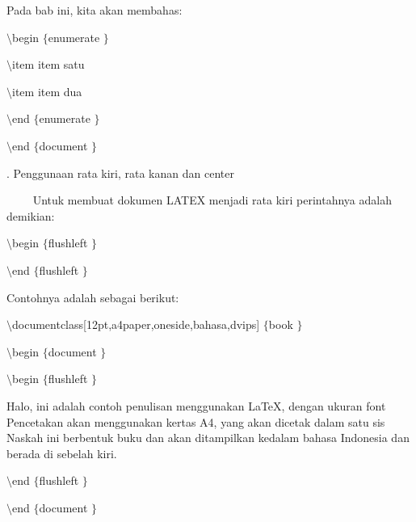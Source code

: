 \vspace{12pt}
{\fontsize{10pt}{10pt}\selectfont Pada bab ini, kita akan membahas:} \par
{\fontsize{10pt}{10pt}\selectfont  $  \setminus  $begin $  \{  $enumerate $  \}  $} \par
{\fontsize{10pt}{10pt}\selectfont  $  \setminus  $item item satu} \par
{\fontsize{10pt}{10pt}\selectfont  $  \setminus  $item item dua} \par
{\fontsize{10pt}{10pt}\selectfont  $  \setminus  $end $  \{  $enumerate $  \}  $} \par
{\fontsize{10pt}{10pt}\selectfont  $  \setminus  $end $  \{  $document $  \}  $} \par
\vspace{10pt}
. Penggunaan rata kiri, rata kanan dan center \par
\noindent 
~~~~ Untuk membuat dokumen LATEX menjadi rata kiri perintahnya adalah demikian: \par
{\fontsize{10pt}{10pt}\selectfont  $  \setminus  $begin $  \{  $flushleft $  \}  $} \par
{\fontsize{10pt}{10pt}\selectfont [kalimat]} \par
{\fontsize{10pt}{10pt}\selectfont  $  \setminus  $end $  \{  $flushleft $  \}  $} \par
\vspace{12pt}
Contohnya adalah sebagai berikut: \par
{\fontsize{10pt}{10pt}\selectfont  $  \setminus  $documentclass[12pt,a4paper,oneside,bahasa,dvips] $  \{  $book $  \}  $} \par
{\fontsize{10pt}{10pt}\selectfont  $  \setminus  $begin $  \{  $document $  \}  $} \par
{\fontsize{10pt}{10pt}\selectfont  $  \setminus  $begin $  \{  $flushleft $  \}  $} \par
\vspace{9pt}
{\fontsize{10pt}{10pt}\selectfont Halo, ini adalah contoh penulisan menggunakan LaTeX, dengan ukuran font Pencetakan akan menggunakan kertas A4, yang akan dicetak dalam satu sis Naskah ini berbentuk buku dan akan ditampilkan kedalam bahasa Indonesia dan berada di sebelah kiri.} \par
\vspace{9pt}
{\fontsize{10pt}{10pt}\selectfont  $  \setminus  $end $  \{  $flushleft $  \}  $} \par
{\fontsize{10pt}{10pt}\selectfont  $  \setminus  $end $  \{  $document $  \}  $} \par
